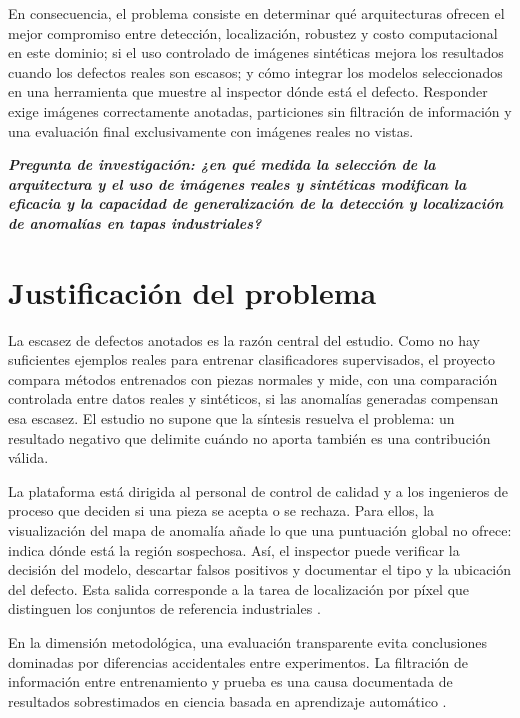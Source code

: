 \documentclass[12pt,oneside]{report}
\newenvironment{destacado}{\par\begin{list}{}{\leftmargin=1.27cm\rightmargin=0pt}\item\relax\bfseries\itshape}{\end{list}}
\begin{document}
En consecuencia, el problema consiste en determinar qué arquitecturas ofrecen el mejor compromiso entre detección, localización, robustez y costo computacional en este dominio; si el uso controlado de imágenes sintéticas mejora los resultados cuando los defectos reales son escasos; y cómo integrar los modelos seleccionados en una herramienta que muestre al inspector dónde está el defecto. Responder exige imágenes correctamente anotadas, particiones sin filtración de información y una evaluación final exclusivamente con imágenes reales no vistas.

\begin{destacado}
Pregunta de investigación: ¿en qué medida la selección de la arquitectura y el uso de imágenes reales y sintéticas modifican la eficacia y la capacidad de generalización de la detección y localización de anomalías en tapas industriales?
\end{destacado}

\section{Justificación del problema}

La escasez de defectos anotados es la razón central del estudio. Como no hay suficientes ejemplos reales para entrenar clasificadores supervisados, el proyecto compara métodos entrenados con piezas normales y mide, con una comparación controlada entre datos reales y sintéticos, si las anomalías generadas compensan esa escasez. El estudio no supone que la síntesis resuelva el problema: un resultado negativo que delimite cuándo no aporta también es una contribución válida.

La plataforma está dirigida al personal de control de calidad y a los ingenieros de proceso que deciden si una pieza se acepta o se rechaza. Para ellos, la visualización del mapa de anomalía añade lo que una puntuación global no ofrece: indica dónde está la región sospechosa. Así, el inspector puede verificar la decisión del modelo, descartar falsos positivos y documentar el tipo y la ubicación del defecto. Esta salida corresponde a la tarea de localización por píxel que distinguen los conjuntos de referencia industriales \cite{bergmann2021}.

En la dimensión metodológica, una evaluación transparente evita conclusiones dominadas por diferencias accidentales entre experimentos. La filtración de información entre entrenamiento y prueba es una causa documentada de resultados sobrestimados en ciencia basada en aprendizaje automático \cite{kapoor2023}.
\end{document}
